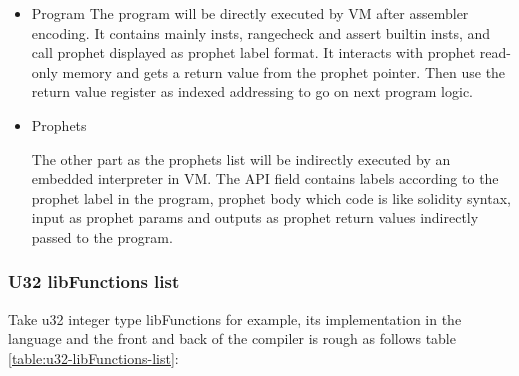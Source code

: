 \begin{itemize}
    \item Program
The program will be directly executed by VM after assembler encoding. It contains mainly insts, rangecheck and assert builtin insts,
and call prophet displayed as prophet label format. It interacts with prophet read-only memory and gets a return value from the prophet pointer.
Then use the return value register as indexed addressing to go on next program logic.
    \item Prophets

The other part as the prophets list will be indirectly executed by an embedded interpreter in VM.
The API field contains labels according to the prophet label in the program, prophet body which code is like solidity syntax,
input as prophet params and outputs as prophet return values indirectly passed to the program.
\end{itemize}

\subsubsection{U32 libFunctions list}
    Take u32 integer type libFunctions for example, its implementation in the language and the front and back of the compiler is rough as follows table \ref{table:u32-libFunctions-list}:

